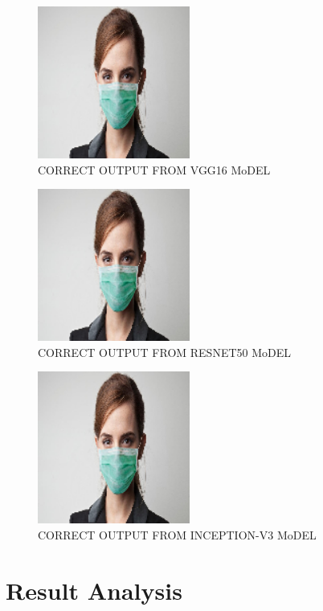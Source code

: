 \documentclass[conference]{IEEEtran}
\begin{document}
\begin{figure}[htbp]
        \centerline{\includegraphics[width=5cm]{vggo.png}}
        \caption{CORRECT OUTPUT FROM VGG16 MoDEL}
        \label{output}
    \end{figure}
\newpage
\begin{figure}[htbp]
        \centerline{\includegraphics[width=5cm]{resneto.png}}
        \caption{CORRECT OUTPUT FROM RESNET50 MoDEL}
        \label{output}
    \end{figure}
\begin{figure}[htbp]
        \centerline{\includegraphics[width=5cm]{inceptiono.png}}
        \caption{CORRECT OUTPUT FROM INCEPTION-V3 MoDEL}
        \label{output}
    \end{figure}
\section{Result Analysis}
\end{document}
